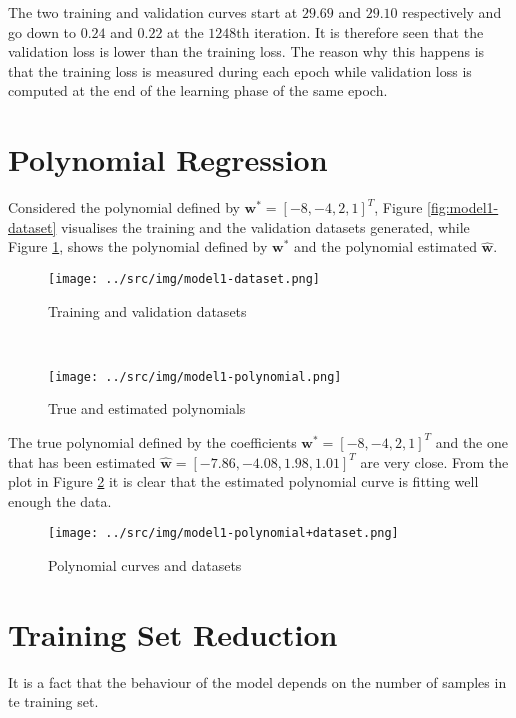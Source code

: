 \documentclass[a4paper,12pt]{article} %
\begin{document}
	The two training and validation curves start at $29.69$ and $29.10$ 
	respectively and go down to $0.24$ and $0.22$ at the $1248\mathrm{th}$ 
	iteration.
	It is therefore seen that the validation loss is lower than the training 
	loss. {\color{red}The reason why this happens is that the training loss is 
	measured during each epoch while validation loss is computed at the end of 
	the learning phase of the same epoch.}
	
	\section{Polynomial Regression} 
	Considered the polynomial defined by $\textbf{w}^*=[-8,-4,2,1]^T$, Figure 
	\ref{fig:model1-dataset} visualises the training and the validation 
	datasets generated, while Figure \ref{fig:model1-polynomial}, shows 
	the polynomial defined by $\textbf{w}^*$ and the polynomial estimated 
	$\hat{\textbf{w}}$.
	
	\begin{figure}[H]
		\begin{minipage}[c]{.49\textwidth}
			\centering
			\texttt{[image: ../src/img/model1-dataset.png]}
			\caption{Training and validation datasets}
			\label{fig:model1-dataset}
		\end{minipage}
		~
		\begin{minipage}[c]{.49\textwidth}
			\centering
			\texttt{[image: ../src/img/model1-polynomial.png]}
			\caption{True and estimated polynomials}
			\label{fig:model1-polynomial}
		\end{minipage}
	\end{figure}
	
 	The true polynomial defined by the coefficients 
 	$\textbf{w}^*=[-8,-4,2,1]^T$ and the one that has been estimated 
 	$\hat{\textbf{w}}=[-7.86,-4.08,1.98,1.01]^T$ are very close.
 	From the plot in Figure \ref{fig:model1-polynomial+dataset} it is clear 
 	that the estimated polynomial curve is fitting well enough the data.
 	
	\begin{figure}[H]
		\centering
		\texttt{[image: ../src/img/model1-polynomial+dataset.png]}
		\caption{Polynomial curves and datasets}
		\label{fig:model1-polynomial+dataset}
	\end{figure}
	
	\section{Training Set Reduction}
	It is a fact that the behaviour of the model depends on the number of 
	samples in te training set.
	
\end{document}
